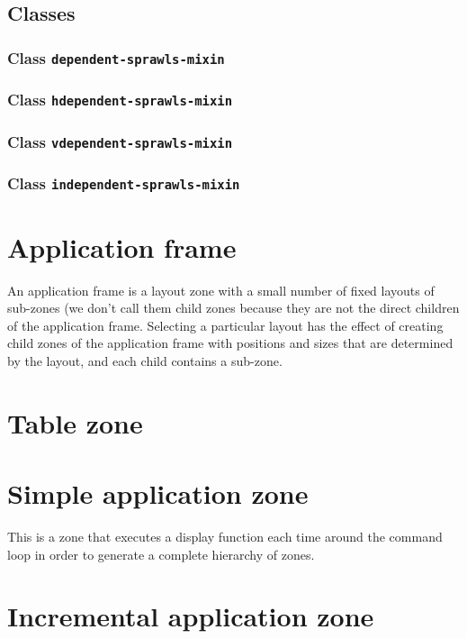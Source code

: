 \documentclass{report}
\begin{document}
\subsection{Classes}

\subsubsection{Class \texttt{dependent-sprawls-mixin}}
\subsubsection{Class \texttt{hdependent-sprawls-mixin}}
\subsubsection{Class \texttt{vdependent-sprawls-mixin}}
\subsubsection{Class \texttt{independent-sprawls-mixin}}

\section{Application frame}

An application frame is a layout zone with a small number of fixed
layouts of sub-zones (we don't call them child zones because they
are not the direct children of the application frame.  Selecting a
particular layout has the effect of creating child zones of the
application frame with positions and sizes that are determined by the
layout, and each child contains a sub-zone.

\section{Table zone}

\section{Simple application zone}

This is a zone that executes a display function each time around the
command loop in order to generate a complete hierarchy of zones.

\section{Incremental application zone}
\end{document}
